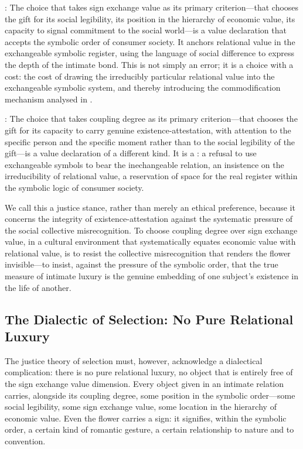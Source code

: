 : The choice that takes sign exchange value as its primary criterion---that chooses the gift for its social legibility, its position in the hierarchy of economic value, its capacity to signal commitment to the social world---is a value declaration that accepts the symbolic order of consumer society. It anchors relational value in the exchangeable symbolic register, using the language of social difference to express the depth of the intimate bond. This is not simply an error; it is a choice with a cost: the cost of drawing the irreducibly particular relational value into the exchangeable symbolic system, and thereby introducing the commodification mechanism analysed in  \parencite{paperxv}.

: The choice that takes coupling degree as its primary criterion---that chooses the gift for its capacity to carry genuine existence-attestation, with attention to the specific person and the specific moment rather than to the social legibility of the gift---is a value declaration of a different kind. It is a : a refusal to use exchangeable symbols to bear the inechangeable relation, an insistence on the irreducibility of relational value, a reservation of space for the real register within the symbolic logic of consumer society.

We call this a justice stance, rather than merely an ethical preference, because it concerns the integrity of existence-attestation against the systematic pressure of the social collective misrecognition. To choose coupling degree over sign exchange value, in a cultural environment that systematically equates economic value with relational value, is to resist the collective misrecognition that renders the flower invisible---to insist, against the pressure of the symbolic order, that the true measure of intimate luxury is the genuine embedding of one subject's existence in the life of another.

\subsection{The Dialectic of Selection: No Pure Relational Luxury}
\label{p16:subsec:no_pure}

\noindent
The justice theory of selection must, however, acknowledge a dialectical complication: there is no pure relational luxury, no object that is entirely free of the sign exchange value dimension. Every object given in an intimate relation carries, alongside its coupling degree, some position in the symbolic order---some social legibility, some sign exchange value, some location in the hierarchy of economic value. Even the flower carries a sign: it signifies, within the symbolic order, a certain kind of romantic gesture, a certain relationship to nature and to convention.

